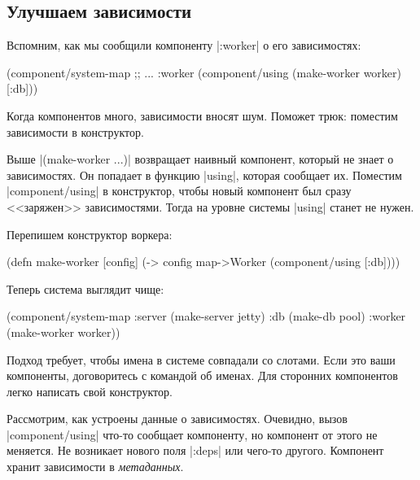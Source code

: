 \subsection{Улучшаем зависимости}

Вспомним, как мы сообщили компоненту \spverb|:worker| о его зависимостях:

\begin{english}
  \begin{clojure}
(component/system-map
 ;; ...
 :worker (component/using
          (make-worker worker) [:db]))
  \end{clojure}
\end{english}

Когда компонентов много, зависимости вносят шум. Поможет трюк: поместим
зависимости в конструктор.

Выше \spverb|(make-worker {...})| возвращает наивный компонент, который не знает
о зависимостях. Он попадает в функцию \spverb|using|, которая сообщает
их. Поместим \spverb|component/using| в конструктор, чтобы новый компонент был
сразу <<заряжен>> зависимостями. Тогда на уровне системы \spverb|using| станет
не нужен.

Перепишем конструктор воркера:

\begin{english}
  \begin{clojure}
(defn make-worker [config]
  (-> config
      map->Worker
      (component/using [:db])))
  \end{clojure}
\end{english}

Теперь система выглядит чище:

\begin{english}
  \begin{clojure}
(component/system-map
 :server (make-server jetty)
 :db     (make-db pool)
 :worker (make-worker worker))
  \end{clojure}
\end{english}

Подход требует, чтобы имена в системе совпадали со слотами. Если это ваши
компоненты, договоритесь с командой об именах. Для сторонних компонентов легко
написать свой конструктор.

Рассмотрим, как устроены данные о зависимостях. Очевидно, вызов
\spverb|component/using| что-то сообщает компоненту, но компонент от этого не
меняется. Не возникает нового поля \spverb|:deps| или чего-то другого. Компонент
хранит зависимости в \emph{метаданных}.

